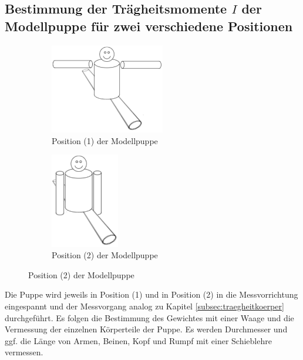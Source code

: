 \subsection{Bestimmung der Trägheitsmomente $I$ der Modellpuppe für zwei verschiedene Positionen}
\begin{figure}[h]
	\centering
	\label{fig:puppe}
	\begin{subfigure}{0.48\textwidth}
		\label{fig:puppe1}
		\centering
		\includegraphics[width=5cm]{Bilder/puppe1.pdf}
		\caption{Position (1) der Modellpuppe}
	\end{subfigure}
	\begin{subfigure}{0.48\textwidth}
		\label{fig:puppe2}
		\centering
		\includegraphics[width=3cm]{Bilder/puppe2.pdf}
		\caption{Position (2) der Modellpuppe}
	\end{subfigure}
\end{figure}
Die Puppe wird jeweils in Position (1) und in Position (2)  in die Messvorrichtung eingespannt und 
der Messvorgang analog zu Kapitel \ref{subsec:traegheitkoerper} durchgeführt. 
Es folgen die Bestimmung des Gewichtes mit einer Waage und die Vermessung der einzelnen Körperteile der Puppe. 
Es werden Durchmesser und ggf. die Länge von Armen, Beinen, Kopf und Rumpf mit einer Schieblehre vermessen.

